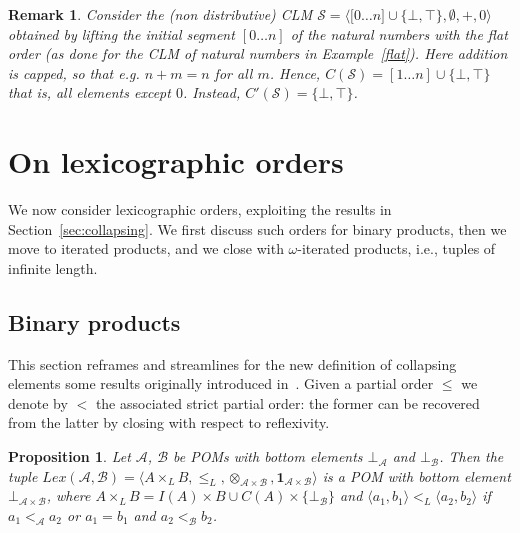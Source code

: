 \documentclass[a4paper]{elsarticle}
\newtheorem{remark}{Remark}
\newtheorem{proposition}{Proposition}
\newcommand{\monop}{\otimes}
\newcommand{\1}{\mathbf{1}}
\begin{document}
\begin{remark}
	Consider the (non distributive) CLM $\mathcal{S} = \langle \mathbb [0 \ldots n] \cup \{\bot,\top\}, \emptyset, +, 0 \rangle$ 
	obtained by lifting the initial segment $[0 \ldots n]$ of the natural numbers with the flat order (as done for
	the CLM of natural numbers in Example~\ref{flat}). Here addition is capped, so that 
	e.g. $n + m = n$ for all $m$. Hence, $C(\mathcal{S}) = [1 \ldots n] \cup \{\bot,\top\}$
	that is, all elements except $0$. Instead, $C'(\mathcal{S}) =  \{\bot,\top\}$.
\end{remark}

\section{On lexicographic orders}\label{sec:lexico}
We now consider lexicographic orders, exploiting the results in Section~\ref{sec:collapsing}.
%
We first discuss such orders for binary products, then we move to iterated products, 
and we close with $\omega$-iterated products, i.e., tuples of infinite length.

\subsection{Binary products}\label{sec:bynary}

This section reframes and streamlines for the new definition of collapsing elements some results originally
introduced in~\cite{GadducciHMW13}. Given a partial order $\leq$ we denote by $<$ the associated strict 
partial order: the former can be recovered from the latter by closing with respect to reflexivity.

\begin{proposition}\label{prop:lexBI}
	Let $\mathcal{A}$, $\mathcal{B}$ be POMs with bottom elements $\bot_\mathcal{A}$ and $\bot_\mathcal{B}$.
	Then the tuple $Lex(\mathcal{A}, \mathcal{B}) = 
	\langle A \times_L B, \leq_L, \monop_{\mathcal{A} \times \mathcal{B}}, \1_{\mathcal{A} \times \mathcal{B}} \rangle$
	is a POM with bottom element $\bot_{\mathcal{A} \times \mathcal{B}}$,
	where $A \times_L B = I(A) \times B \cup C(A) \times \{\bot_\mathcal{B}\}$ and
		$\langle a_1, b_1\rangle <_L \langle a_2, b_2\rangle$ if $a_1 <_\mathcal{A} a_2$ or $a_1 = b_1$ 
		and  $a_2 <_\mathcal{B} b_2$.
\end{proposition}
\end{document}
